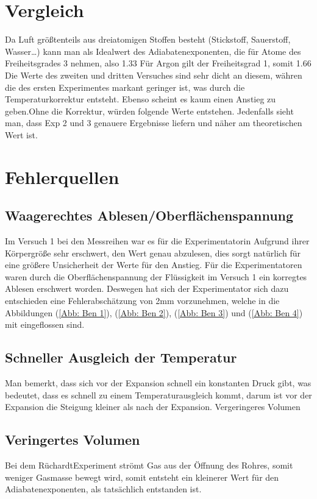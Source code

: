 \documentclass[bibliography=totocnumbered]{scrartcl}
\begin{document}
	\section{Vergleich }
	Da Luft größtenteils aus dreiatomigen Stoffen besteht (Stickstoff, Sauerstoff, Wasser…) kann man als Idealwert des Adiabatenexponenten, die für Atome des Freiheitsgrades 3 nehmen, also 1.33
	Für Argon gilt der Freiheitsgrad 1, somit 1.66
	Die Werte des zweiten und dritten Versuches sind sehr dicht an diesem, währen die des ersten Experimentes markant geringer ist, was durch die Temperaturkorrektur entsteht. Ebenso scheint es kaum einen Anstieg zu geben.Ohne die Korrektur, würden folgende Werte entstehen.
	Jedenfalls sieht man, dass Exp 2 und 3 genauere Ergebnisse liefern und näher am theoretischen Wert ist.
	
	
	\section{Fehlerquellen}
	\subsection{Waagerechtes Ablesen/Oberflächenspannung}
	Im Versuch 1 bei den Messreihen war es für die Experimentatorin Aufgrund ihrer Körpergröße sehr erschwert, den Wert genau abzulesen, dies sorgt natürlich für eine größere Unsicherheit der Werte für den Anstieg. Für die Experimentatoren waren durch die Oberflächenspannung der Flüssigkeit im Versuch 1 ein korregtes Ablesen erschwert worden. Deswegen hat sich der Experimentator sich dazu entschieden eine Fehlerabschätzung von 2mm vorzunehmen, welche in die Abbildungen (\ref{Abb: Ben 1}), (\ref{Abb: Ben 2}), (\ref{Abb: Ben 3}) und (\ref{Abb: Ben 4}) mit eingeflossen sind.\\
	\subsection{Schneller Ausgleich der Temperatur}
	Man bemerkt, dass sich vor der Expansion schnell ein konstanten Druck gibt, was bedeutet, dass es schnell zu einem Temperaturausgleich kommt, darum ist vor der Expansion die Steigung kleiner als nach der Expansion.
	Vergeringeres Volumen\\
	\subsection{Veringertes Volumen}
	Bei dem RüchardtExperiment strömt Gas aus der Öffnung des Rohres, somit weniger Gasmasse bewegt wird, somit entsteht ein kleinerer Wert für den Adiabatenexponenten, als tatsächlich entstanden ist.\\
\end{document}
